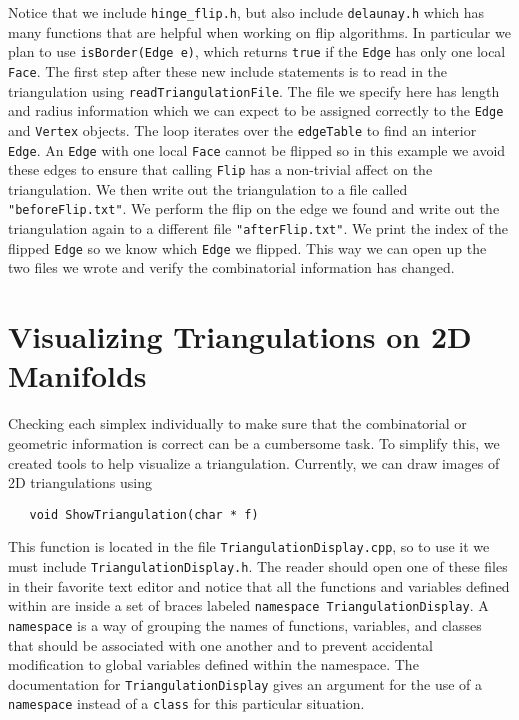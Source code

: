 \documentclass{amsart}
\theoremstyle{plain}
\numberwithin{equation}{section}
\begin{document}
\bigskip

Notice that we include \verb|hinge_flip.h|, but also include \verb|delaunay.h| which has many functions that are helpful when working on flip algorithms. In particular we plan to use \verb|isBorder(Edge e)|, which returns \verb|true| if the \verb|Edge| has only one local \verb|Face|. The first step after these new include statements is to read in the triangulation using \verb|readTriangulationFile|. The file we specify here has length and radius information which we can expect to be assigned correctly to the \verb|Edge| and \verb|Vertex| objects. The loop iterates over the \verb|edgeTable| to find an interior \verb|Edge|. An \verb|Edge| with one local \verb|Face| cannot be flipped so in this example we avoid these edges to ensure that calling \verb|Flip| has a non-trivial affect on the triangulation. We then write out the triangulation to a file called \verb|"beforeFlip.txt"|. We perform the flip on the edge we found and write out the triangulation again to a different file \verb|"afterFlip.txt"|. We print the index of the flipped \verb|Edge| so we know which \verb|Edge| we flipped. This way we can open up the two files we wrote and verify the combinatorial information has changed.

\section*{Visualizing Triangulations on 2D Manifolds}

Checking each simplex individually to make sure that the combinatorial or geometric information is correct can be a cumbersome task. To simplify this, we created tools to help visualize a triangulation. Currently, we can draw images of 2D triangulations using\\

\begin{verbatim}
   void ShowTriangulation(char * f) 
\end{verbatim}

\bigskip

This function is located in the file \verb|TriangulationDisplay.cpp|, so to use it we must include \verb|TriangulationDisplay.h|. The reader should open one of these files in their favorite text editor and notice that all the functions and variables defined within are inside a set of braces labeled \verb|namespace TriangulationDisplay|. A \verb|namespace| is a way of grouping the names of functions, variables, and classes that should be associated with one another and to prevent accidental modification to global variables defined within the namespace. The documentation for \verb|TriangulationDisplay| gives an argument for the use of a \verb|namespace| instead of a \verb|class| for this particular situation.
\end{document}
